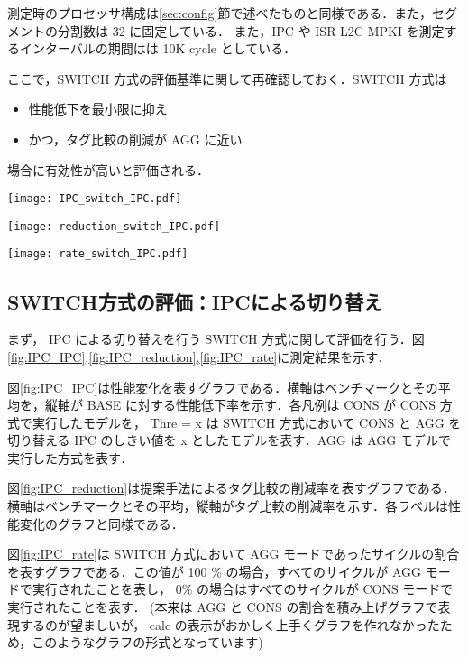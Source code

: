 \documentclass[twocolumn]{jsarticle}
\begin{document}
  測定時のプロセッサ構成は\ref{sec:config}節で述べたものと同様である．また，セグメントの分割数は 32 に固定している． また，IPC や ISR L2C MPKI を測定するインターバルの期間はは 10K cycle としている．

  ここで，SWITCH 方式の評価基準に関して再確認しておく．SWITCH 方式は
  \begin{itemize}
    \item 性能低下を最小限に抑え
    \item かつ，タグ比較の削減が AGG に近い
  \end{itemize}
  場合に有効性が高いと評価される．

  \begin{figure*}[ht]
    \centering
    \texttt{[image: IPC\_switch\_IPC.pdf]}
    \caption{SWITCH 方式による性能変化(IPC を用いた方式)}  
    \label{fig:IPC_IPC}
  \end{figure*}
  \begin{figure*}[ht]
    \centering
    \texttt{[image: reduction\_switch\_IPC.pdf]}
    \caption{SWITCH 方式によるタグ比較の削減(IPC を用いた方式)}  
    \label{fig:IPC_reduction}
  \end{figure*}
  \begin{figure*}[ht]
    \centering
    \texttt{[image: rate\_switch\_IPC.pdf]}
    \caption{AGG モードである割合(IPC を用いた方式)}  
    \label{fig:IPC_rate}
  \end{figure*}

  \subsection{SWITCH方式の評価：IPCによる切り替え}
  まず， IPC による切り替えを行う SWITCH 方式に関して評価を行う．図\ref{fig:IPC_IPC},\ref{fig:IPC_reduction},\ref{fig:IPC_rate}に測定結果を示す．

  図\ref{fig:IPC_IPC}は性能変化を表すグラフである．横軸はベンチマークとその平均を，縦軸が BASE に対する性能低下率を示す．各凡例は CONS が CONS 方式で実行したモデルを， Thre = x は SWITCH 方式において CONS と AGG を切り替える IPC のしきい値を x としたモデルを表す．AGG は AGG モデルで実行した方式を表す．

  図\ref{fig:IPC_reduction}は提案手法によるタグ比較の削減率を表すグラフである．横軸はベンチマークとその平均，縦軸がタグ比較の削減率を示す．各ラベルは性能変化のグラフと同様である．
  
  図\ref{fig:IPC_rate}は SWITCH 方式において AGG モードであったサイクルの割合を表すグラフである．この値が 100 \% の場合，すべてのサイクルが AGG モードで実行されたことを表し， 0\% の場合はすべてのサイクルが CONS モードで実行されたことを表す． (本来は AGG と CONS の割合を積み上げグラフで表現するのが望ましいが， calc の表示がおかしく上手くグラフを作れなかったため，このようなグラフの形式となっています)
  
\end{document}
